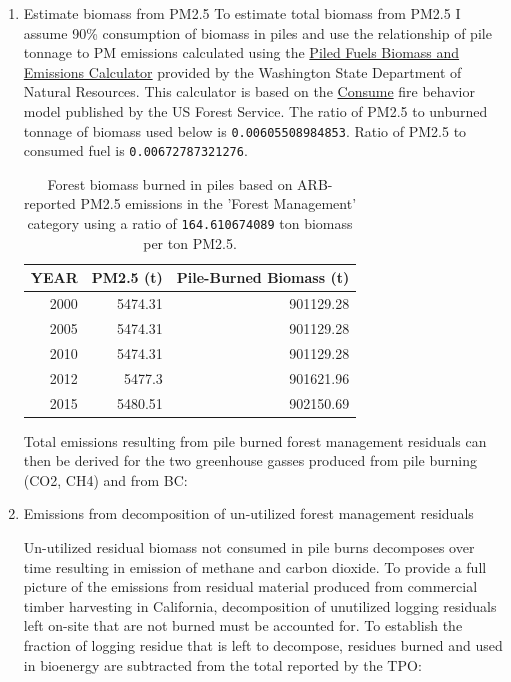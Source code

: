 \documentclass[a4paper]{article}
\begin{document}
\begin{enumerate}
\item Estimate biomass from PM2.5
\label{sec-3-4-0-1}
To estimate total biomass from PM2.5 I assume 90\% consumption of biomass in piles and use the relationship of pile tonnage to PM emissions calculated using the \href{http://depts.washington.edu/nwfire/piles/}{Piled Fuels Biomass and Emissions Calculator} provided by the Washington State Department of Natural Resources. This calculator is based on the \href{http://www.fs.fed.us/pnw/fera/research/smoke/consume/index.shtml}{Consume} fire behavior model published by the US Forest Service. The ratio of PM2.5 to unburned tonnage of biomass used below is \texttt{0.00605508984853}. Ratio of PM2.5 to consumed fuel is \texttt{0.00672787321276}.


\begin{table}[htb]
\caption{Forest biomass burned in piles based on ARB-reported PM2.5 emissions in the 'Forest Management' category using a ratio of \texttt{164.610674089} ton biomass per ton PM2.5.}
\centering
\begin{tabular}{rrr}
YEAR & PM2.5 (t) & Pile-Burned Biomass (t)\\
\hline
2000 & 5474.31 & 901129.28\\
2005 & 5474.31 & 901129.28\\
2010 & 5474.31 & 901129.28\\
2012 & 5477.3 & 901621.96\\
2015 & 5480.51 & 902150.69\\
\end{tabular}
\end{table}

Total emissions resulting from pile burned forest management residuals
can then be derived for the two greenhouse gasses produced from pile
burning (CO2, CH4) and from BC:


\item Emissions from decomposition of un-utilized forest management residuals
\label{sec-3-4-0-2}

Un-utilized residual biomass not consumed in pile burns decomposes over
time resulting in emission of methane and carbon dioxide. To provide a
full picture of the emissions from residual material produced from
commercial timber harvesting in California, decomposition of unutilized
logging residuals left on-site that are not burned must be accounted
for. To establish the fraction of logging residue that is left to
decompose, residues burned and used in bioenergy are subtracted from the
total reported by the TPO:


\end{enumerate}
\end{document}
